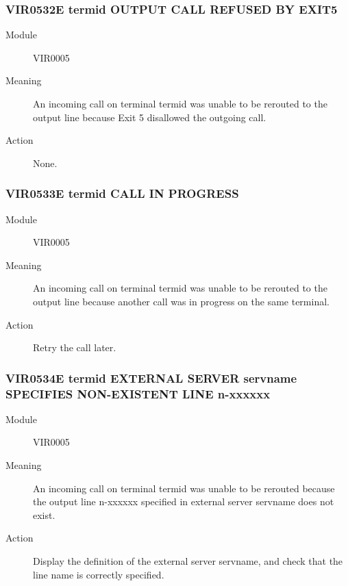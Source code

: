 \documentclass[letterpaper,10pt,english]{sphinxmanual}
\begin{document}
\subsubsection{VIR0532E termid OUTPUT CALL REFUSED BY EXIT5}
\label{\detokenize{messages:vir0532e-termid-output-call-refused-by-exit5}}\begin{description}
\item[{Module}] \leavevmode
VIR0005

\item[{Meaning}] \leavevmode
An incoming call on terminal termid was unable to be rerouted to the output line because Exit 5 disallowed the outgoing call.

\item[{Action}] \leavevmode
None.

\end{description}


\subsubsection{VIR0533E termid CALL IN PROGRESS}
\label{\detokenize{messages:vir0533e-termid-call-in-progress}}\begin{description}
\item[{Module}] \leavevmode
VIR0005

\item[{Meaning}] \leavevmode
An incoming call on terminal termid was unable to be rerouted to the output line because another call was in progress on the same terminal.

\item[{Action}] \leavevmode
Retry the call later.

\end{description}


\subsubsection{VIR0534E termid EXTERNAL SERVER servname SPECIFIES NON-EXISTENT LINE n-xxxxxx}
\label{\detokenize{messages:vir0534e-termid-external-server-servname-specifies-non-existent-line-n-xxxxxx}}\begin{description}
\item[{Module}] \leavevmode
VIR0005

\item[{Meaning}] \leavevmode
An incoming call on terminal termid was unable to be rerouted because the output line n-xxxxxx specified in external server servname does not exist.

\item[{Action}] \leavevmode
Display the definition of the external server servname, and check that the line name is correctly specified.

\end{description}
\end{document}
